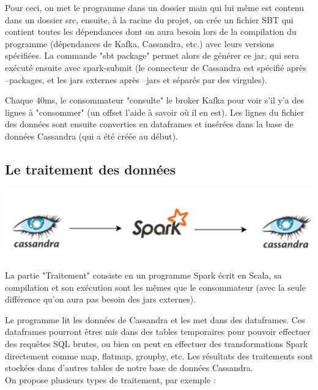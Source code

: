 \documentclass[a4paper, 11pt, titlepage]{article}
\begin{document}
Pour ceci, on met le programme dans un dossier main qui lui même est contenu dans un dossier src, ensuite, à la racine du projet, on crée un fichier SBT qui contient toutes les dépendances dont on aura besoin lors de la compilation du programme (dépendances de Kafka, Cassandra, etc.) avec leurs versions spécifiées. La commande "sbt package" permet alors de générer ce jar, qui sera exécuté ensuite avec spark-submit (le connecteur de Cassandra est spécifié après --packages, et les jars externes après --jars et séparés par des virgules).

Chaque 40ms, le consommateur "consulte" le broker Kafka pour voir s'il y'a des lignes à "consommer" (un offset l'aide à savoir où il en est). Les lignes du fichier des données sont ensuite converties en dataframes et insérées dans la base de données Cassandra (qui a été créée au début).
 

\subsection {Le traitement des données}

\begin{center}
    \includegraphics[scale=0.55]{res/demo2.png}
\end{center}

La partie "Traitement" consiste en un programme Spark écrit en Scala, sa compilation et son exécution sont les mêmes que le consommateur (avec la seule différence qu'on aura pas besoin des jars externes).

Le programme lit les données de Cassandra et les met dans des dataframes. Ces dataframes pourront êtres mis dans des tables temporaires pour pouvoir effectuer des requêtes SQL brutes, ou bien on peut en effectuer des transformations Spark directement comme map, flatmap, groupby, etc.
Les résultats des traitements sont stockées dans d'autres tables de notre base de données Cassandra.\\


On propose plusieurs types de traitement, par exemple :
\end{document}
